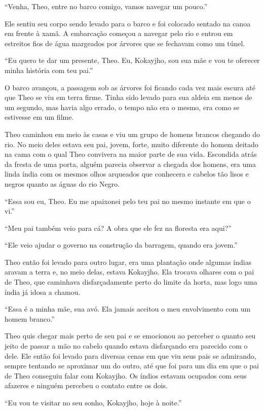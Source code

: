 ``Venha, Theo, entre no barco comigo, vamos navegar um pouco.''

Ele sentiu seu corpo sendo levado para o barco e foi colocado sentado na
canoa em frente à xamã. A embarcação começou a navegar pelo rio e entrou
em estreitos fios de água margeados por árvores que se fechavam como um
túnel.

``Eu quero te dar um presente, Theo. Eu, Kokayjho, sou sua mãe e vou te
oferecer minha história com teu pai.''

O barco avançou, a passagem sob as árvores foi ficando cada vez mais
escura até que Theo se viu em terra firme. Tinha sido levado para sua
aldeia em menos de um segundo, mas havia algo errado, o tempo não era o
mesmo, era como se estivesse em um filme.

Theo caminhou em meio às casas e viu um grupo de homens brancos chegando
do rio. No meio deles estava seu pai, jovem, forte, muito diferente do
homem deitado na cama com o qual Theo convivera na maior parte de sua
vida. Escondida atrás da fresta de uma porta, alguém parecia observar a
chegada dos homens, era uma linda índia com os mesmos olhos arqueados
que conhecera e cabelos tão lisos e negros quanto as águas do rio Negro.

``Essa sou eu, Theo. Eu me apaixonei pelo teu pai no mesmo instante em
que o vi.''

``Meu pai também veio para cá? A obra que ele fez na floresta era
aqui?''

``Ele veio ajudar o governo na construção da barragem, quando era
jovem.''

Theo então foi levado para outro lugar, era uma plantação onde algumas
índias aravam a terra e, no meio delas, estava Kokayjho. Ela trocava
olhares com o pai de Theo, que caminhava disfarçadamente perto do limite
da horta, mas logo uma índia já idosa a chamou.

``Essa é a minha mãe, sua avó. Ela jamais aceitou o meu envolvimento com
um homem branco.''

Theo quis chegar mais perto de seu pai e se emocionou ao perceber o
quanto seu jeito de passar a mão no cabelo quando estava disfarçando era
parecido com o dele. Ele então foi levado para diversas cenas em que viu
seus pais se admirando, sempre tentando se aproximar um do outro, até
que foi para um dia em que o pai de Theo conseguiu falar com Kokayjho.
Os índios estavam ocupados com seus afazeres e ninguém percebeu o
contato entre os dois.

``Eu vou te visitar no seu sonho, Kokayjho, hoje à noite.''

